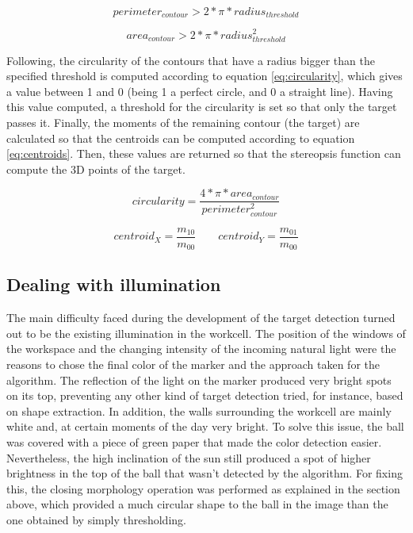 \begin{equation}
perimeter_{contour}>2*\pi*radius_{threshold}
\label{eq:circ_perimeter}
\end{equation}

\begin{equation}
area_{contour}>2*\pi*radius_{threshold}^{2}
\label{eq:circ_area}
\end{equation}

Following, the circularity of the contours that have a radius bigger than the specified threshold is computed according to equation \ref{eq:circularity}, which gives a value between 1 and 0 (being 1 a perfect circle, and 0 a straight line). Having this value computed, a threshold for the circularity is set so that only the target passes it. Finally, the moments of the remaining contour (the target) are calculated so that the centroids can be computed according to equation \ref{eq:centroids}. Then, these values are returned so that the stereopsis function can compute the 3D points of the target.

\begin{equation}
circularity=\frac{4*\pi*area_{contour}}{perimeter_{contour}^{2}}
\label{eq:circularity}
\end{equation}

\begin{equation}
centroid_{X}=\frac{m_{10}}{m_{00}} \qquad centroid_{Y}=\frac{m_{01}}{m_{00}}
\label{eq:centroids}
\end{equation}

\subsection{Dealing with illumination}
The main difficulty faced during the development of the target detection turned out to be the existing illumination in the workcell. 
The position of the windows of the workspace and the changing intensity of the incoming natural light were the reasons to chose the final color of the marker and the approach taken for the algorithm.
The reflection of the light on the marker produced very bright spots on its top, preventing any other kind of target detection tried, for instance, based on shape extraction.
In addition, the walls surrounding the workcell are mainly white and, at certain moments of the day very bright.
To solve this issue, the ball was covered with a piece of green paper that made the color detection easier. Nevertheless, the high inclination of the sun still produced a spot of higher brightness in the top of the ball that wasn't detected by the algorithm. For fixing this, the closing morphology operation was performed as explained in the section above, which provided a much circular shape to the ball in the image than the one obtained by simply thresholding.

